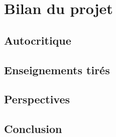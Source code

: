 \section{Bilan du projet}

\subsection{Autocritique}


\subsection{Enseignements tirés}


\subsection{Perspectives}


\subsection{Conclusion}

